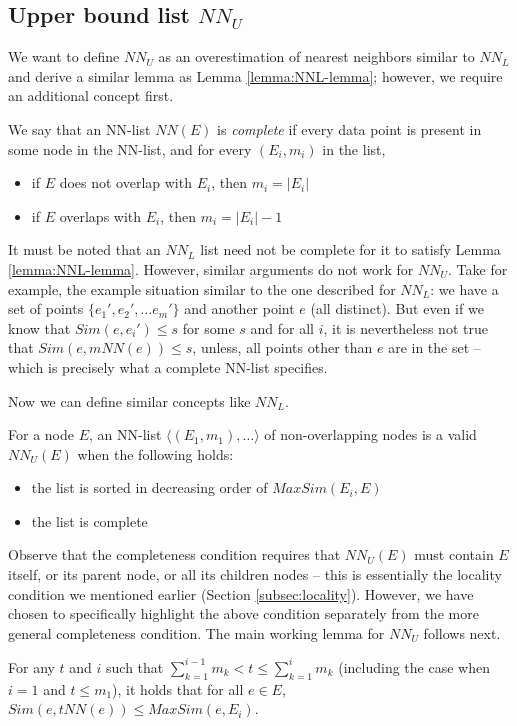 \documentclass[prodmode,letterpaper]{acmsmall}
\begin{document}
\subsection{Upper bound list $NN_U$}\label{sec:nn-u}
We want to define $NN_U$ as an overestimation of nearest neighbors similar to
$NN_L$ and derive a similar lemma as Lemma \ref{lemma:NNL-lemma}; however, we
require an additional concept first.


\begin{definition}
    We say that an NN-list $NN(E)$ is {\em complete} if every data
    point is present in some node in the NN-list, and for every $(E_i,m_i)$ in the list, 
\begin{itemize}
\item if $E$ does not overlap with $E_i$, then $m_i = \vert E_i \vert$
\item if $E$ overlaps with $E_i$, then $m_i = \vert E_i \vert - 1$
\end{itemize}
\end{definition}

It must
be noted that an $NN_L$ list need not be complete for it to satisfy Lemma
\ref{lemma:NNL-lemma}. However,
similar arguments do not work for $NN_U$. Take for example, the example
situation similar to
the one described for $NN_L$: we have a set of points $\lbrace e_1',e_2',\ldots
e_m' \rbrace$ and another point $e$ (all distinct). But even if we know that
$Sim(e,e_i') \leq s$ for some $s$ and for all $i$, it is nevertheless not true
that $Sim(e,mNN(e)) \leq s$, unless, all points other than $e$ are in the set --
which is precisely what a complete NN-list specifies.

Now we can define similar concepts like $NN_L$.
\begin{definition}
For a node $E$, an NN-list $\langle (E_1,m_1),\ldots \rangle$ of non-overlapping nodes is a valid $NN_U(E)$ when the following holds:
\begin{itemize}
\item the list is sorted in decreasing order of $MaxSim(E_i,E)$
\item the list is complete
\end{itemize}
\end{definition}


Observe that the completeness condition requires that $NN_U(E)$ must contain $E$
itself, or its parent node, or all its children nodes -- this is essentially
the locality condition we mentioned earlier (Section \ref{subsec:locality}).
However, we have chosen to specifically highlight the above condition separately
from the more general completeness condition.
The main working lemma for $NN_U$ follows next.
\begin{lemma}\label{lemma:NNU-lemma}
    For any $t$ and $i$ such that $\sum_{k=1}^{i-1} m_k < t \leq \sum_{k=1}^i
    m_k$ (including the case when $i=1$ and $t \le m_1$), it holds that for all $e \in
    E$, $Sim(e,tNN(e)) \le MaxSim(e,E_i)$.
\end{lemma}
\end{document}
